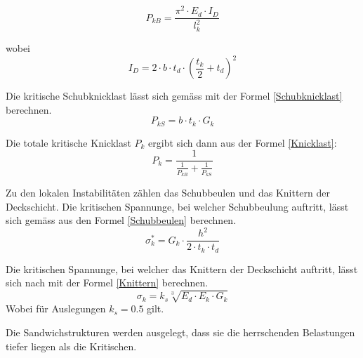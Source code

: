    \begin{equation}
      \label{Euler-Knicklast}
      P_{kB}=\frac{\pi^2 \cdot E_d \cdot I_D}{l_k^2}
    \end{equation}

    wobei
    \begin{equation}
      \label{ID}
      I_D = 2\cdot b \cdot t_d\cdot \left ( \frac{t_k}{2}+t_d \right )^2
    \end{equation}

    Die kritische Schubknicklast lässt sich gemäss \cite{ETH} mit der Formel \ref{Schubknicklast} berechnen.
    \begin{equation}
      \label{Schubknicklast}
      P_{kS} = b \cdot t_k \cdot G_k
    \end{equation}

    Die totale kritische Knicklast \(P_k\) ergibt sich dann aus der Formel \ref{Knicklast}:
    \begin{equation}
      \label{Knicklast}
      P_k=\frac{1}{\frac{1}{P_{kB}}+\frac{1}{P_{kS}}}
    \end{equation}

    Zu den lokalen Instabilitäten zählen das Schubbeulen und das Knittern der Deckschicht. Die kritischen Spannunge, bei welcher Schubbeulung auftritt, lässt sich gemäss \cite{ETH} aus den Formel \ref{Schubbeulen} berechnen.
    \begin{equation}
      \label{Schubbeulen}
      \sigma_k^* = G_k \cdot \frac{h^2}{2 \cdot t_k \cdot t_d}
    \end{equation}

    Die kritischen Spannunge, bei welcher das Knittern der Deckschicht auftritt, lässt sich nach \cite{ETH} mit der Formel \ref{Knittern} berechnen.
    \begin{equation}
      \label{Knittern}
      \sigma_k = k_s\sqrt[3]{E_d \cdot E_k \cdot G_k}
    \end{equation}
    Wobei für Auslegungen \(k_s = 0.5\) gilt.

    Die Sandwichstrukturen werden ausgelegt, dass sie die herrschenden Belastungen tiefer liegen als die Kritischen.

